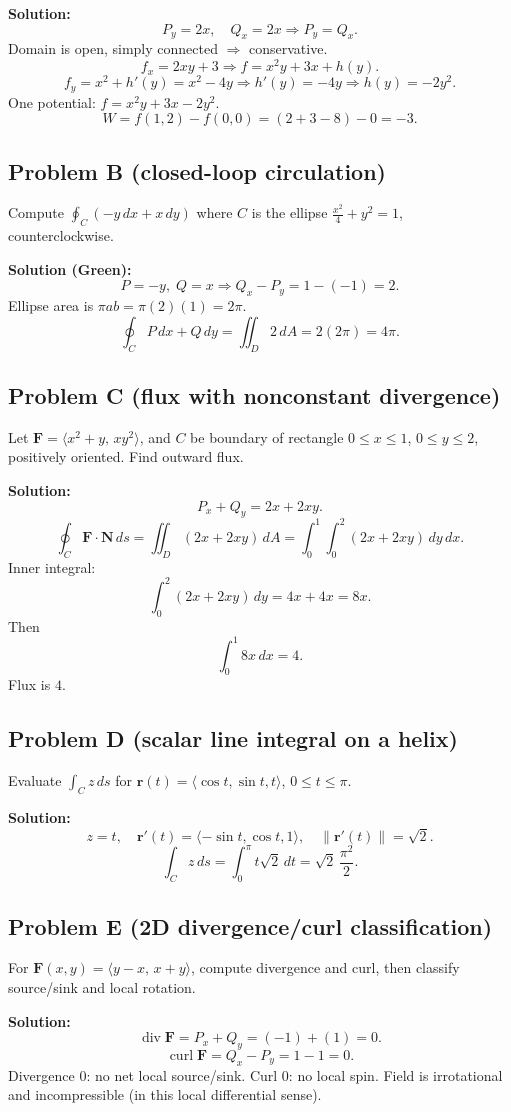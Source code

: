 \documentclass[12pt, twoside]{article}
\begin{document}
\textbf{Solution:}
\[
P_y=2x,\quad Q_x=2x\Rightarrow P_y=Q_x.
\]
Domain is open, simply connected $\Rightarrow$ conservative.
\[
f_x=2xy+3\Rightarrow f=x^2y+3x+h(y).
\]
\[
f_y=x^2+h'(y)=x^2-4y\Rightarrow h'(y)=-4y\Rightarrow h(y)=-2y^2.
\]
One potential: $f=x^2y+3x-2y^2$.
\[
W=f(1,2)-f(0,0)=(2+3-8)-0=-3.
\]

\subsection*{Problem B (closed-loop circulation)}
Compute $\oint_C(-y\,dx+x\,dy)$ where $C$ is the ellipse $\frac{x^2}{4}+y^2=1$, counterclockwise.

\textbf{Solution (Green):}
\[
P=-y,\;Q=x\Rightarrow Q_x-P_y=1-(-1)=2.
\]
Ellipse area is $\pi ab=\pi(2)(1)=2\pi$.
\[
\oint_C P\,dx+Q\,dy=\iint_D2\,dA=2(2\pi)=4\pi.
\]

\subsection*{Problem C (flux with nonconstant divergence)}
Let $\mathbf{F}=\langle x^2+y,\,xy^2\rangle$, and $C$ be boundary of rectangle $0\le x\le1$, $0\le y\le2$, positively oriented. Find outward flux.

\textbf{Solution:}
\[
P_x+Q_y=2x+2xy.
\]
\[
\oint_C\mathbf{F}\cdot\mathbf{N}\,ds
=\iint_D(2x+2xy)\,dA
=\int_0^1\int_0^2(2x+2xy)\,dy\,dx.
\]
Inner integral:
\[
\int_0^2(2x+2xy)\,dy=4x+4x=8x.
\]
Then
\[
\int_0^1 8x\,dx=4.
\]
Flux is $4$.

\subsection*{Problem D (scalar line integral on a helix)}
Evaluate $\int_C z\,ds$ for $\mathbf{r}(t)=\langle\cos t,\sin t,t\rangle$, $0\le t\le\pi$.

\textbf{Solution:}
\[
z=t,
\quad \mathbf{r}'(t)=\langle-\sin t,\cos t,1\rangle,
\quad \|\mathbf{r}'(t)\|=\sqrt{2}.
\]
\[
\int_C z\,ds=\int_0^\pi t\sqrt2\,dt=\sqrt2\,\frac{\pi^2}{2}.
\]

\subsection*{Problem E (2D divergence/curl classification)}
For $\mathbf{F}(x,y)=\langle y-x,\,x+y\rangle$, compute divergence and curl, then classify source/sink and local rotation.

\textbf{Solution:}
\[
\operatorname{div}\mathbf{F}=P_x+Q_y=(-1)+(1)=0.
\]
\[
\operatorname{curl}\mathbf{F}=Q_x-P_y=1-1=0.
\]
Divergence $0$: no net local source/sink. Curl $0$: no local spin. Field is irrotational and incompressible (in this local differential sense).
\end{document}
